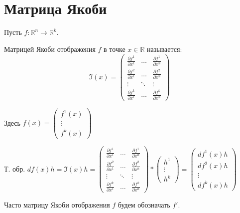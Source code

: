 \documentclass{report}
\theoremstyle{definition}
\begin{document}
\section*{Матрица Якоби}

Пусть $f:\mathbb{R}^n \rightarrow \mathbb{R}^k$.

Матрицей Якоби отображения $f$ в точке $x\in\mathbb{R}$ называется:
\begin{equation*}
  \mathfrak{I}(x) = \left(
    \begin{array}{ccc}
      \frac{\partial f^1}{\partial x^1} & \ldots & \frac{\partial f^1}{\partial x^n} \\
      \frac{\partial f^2}{\partial x^1} & \ldots & \frac{\partial f^2}{\partial x^n} \\
      \vdots & \ddots & \vdots \\
      \frac{\partial f^k}{\partial x^1} & \ldots & \frac{\partial f^k}{\partial x^n}
    \end{array}
  \right)
\end{equation*}

Здесь $f(x) = \left(
  \begin{array}{c}
    f^1(x) \\
    \vdots \\
    f^k(x)
  \end{array}
\right)$

Т. обр. $df(x)h = \mathfrak{I}(x)h = \left(
  \begin{array}{ccc}
    \frac{\partial f^1}{\partial x^1} & \ldots & \frac{\partial f^1}{\partial x^n} \\
    \frac{\partial f^2}{\partial x^1} & \ldots & \frac{\partial f^2}{\partial x^n} \\
    \vdots & \ddots & \vdots \\
    \frac{\partial f^k}{\partial x^1} & \ldots & \frac{\partial f^k}{\partial x^n}
  \end{array}
\right) * \left(
  \begin{array}{c}
    h^1 \\
    \vdots \\
    h^k
  \end{array}
\right) = \left(
  \begin{array}{ccc}
    df^1(x)h \\
    df^2(x)h \\
    \vdots \\
    df^k(x)h
  \end{array}
\right)$

Часто матрицу Якоби отображения $f$ будем обозначать $f'$.
\end{document}
